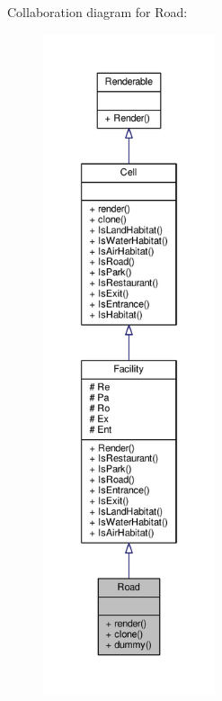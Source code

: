 Collaboration diagram for Road\+:
\nopagebreak
\begin{figure}[H]
\begin{center}
\leavevmode
\includegraphics[height=550pt]{classRoad__coll__graph}
\end{center}
\end{figure}
